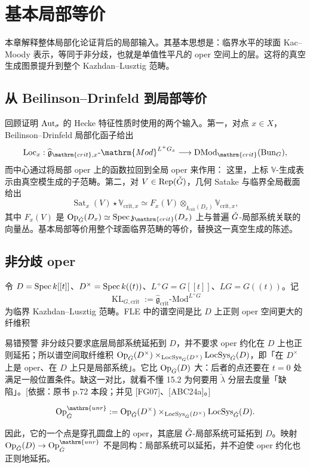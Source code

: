 \chapter{基本局部等价}\label{ch:15}
本章解释整体局部化论证背后的局部输入\cite{FG05,FG07,ABC24a}。其基本思想是：临界水平的球面 Kac–Moody 表示，等同于非分歧，也就是单值性平凡的 oper 空间上的层。这将的真空生成图景提升到整个 Kazhdan–Lusztig 范畴。

\section{从 Beilinson–Drinfeld 到局部等价}\label{sec:15.1}
回顾证明 $\operatorname{Aut}_\sigma$ 的 Hecke 特征性质时使用的两个输入。第一，对点 $x\in X$，Beilinson–Drinfeld 局部化函子给出
\[\operatorname{Loc}_x:\widehat{\mathfrak g}_{\mathrm{crit},x}\text{-}\mathrm{Mod}^{L^+G_x}\longrightarrow\DMod_{\mathrm{crit}}(\Bun_G),\]
而中心通过将局部 oper 上的函数拉回到全局 oper 来作用：
这里，上标 $\mathbb V$-生成表示由真空模生成的子范畴。第二，对 $V\in\operatorname{Rep}(\check{G})$，几何 Satake 与临界全局截面给出
\[\operatorname{Sat}_x(V)\star\mathbb V_{\mathrm{crit},x}\simeq F_x(V)\otimes_{\mathfrak z_{\mathrm{crit}}(D_x)}\mathbb V_{\mathrm{crit},x},\]
其中 $F_x(V)$ 是 $\Op_{\checkG}(D_x)\simeq\Spec\mathfrak z_{\mathrm{crit}}(D_x)$ 上与普遍 $\check{G}$-局部系统关联的向量丛。基本局部等价用整个球面临界范畴的等价，替换这一真空生成的陈述。

\section{非分歧 oper}\label{sec:15.2}
令 $D=\operatorname{Spec} k[[t]]$、$D^\times=\operatorname{Spec} k((t))$、$L^+G=G[[t]]$、$LG=G((t))$。记
\[\operatorname{KL}_{G,\mathrm{crit}}:=\widehat{\mathfrak g}_{\mathrm{crit}}\text{-}\mathrm{Mod}^{L^+G}\]
为临界 Kazhdan–Lusztig 范畴。FLE 中的谱空间是比 $D$ 上正则 oper 空间更大的纤维积

\begin{transnote}{易错预警}
非分歧只要求底层局部系统延拓到 $D$，并不要求 oper 约化在 $D$ 上也正则延拓；所以谱空间取纤维积 $\operatorname{Op}_{\check{G}}(D^\times)\times_{\operatorname{LocSys}_{\check{G}}(D^\times)}\operatorname{LocSys}_{\check{G}}(D)$，即「在 $D^\times$ 上是 oper、在 $D$ 上只是局部系统」。它比 $\operatorname{Op}_{\check{G}}(D)$ 大：后者的点还要在 $t=0$ 处满足一般位置条件。缺这一对比，就看不懂 15.2 为何要用 $\check\lambda$ 分层去度量「缺陷」。[依据：原书 p.72 本段；并见 [FG07]、[ABC24a]。]
\end{transnote}
\begin{definition*}{}
\[\Op^{\mathrm{unr}}_{\checkG}:=\Op_{\checkG}(D^\times)\times_{\LocSys_{\checkG}(D^\times)}\LocSys_{\checkG}(D).\]
\end{definition*}
因此，它的一个点是穿孔圆盘上的 oper，其底层 $\check{G}$-局部系统可延拓到 $D$。映射 $\Op_{\checkG}(D)\to\Op^{\mathrm{unr}}_{\checkG}$ 不是同构：局部系统可以延拓，并不迫使 oper 约化也正则地延拓。


